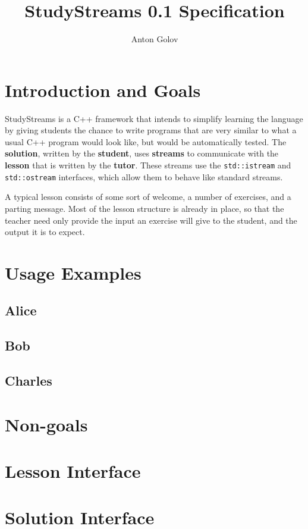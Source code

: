 \documentclass[12pt,a4paper]{report}
\title{StudyStreams 0.1 Specification}
\author{Anton Golov}
\begin{document}
	\maketitle{}
	\tableofcontents{}
	\chapter{Introduction and Goals}
		StudyStreams is a C++ framework that intends to simplify learning
		the language by giving students the chance to write programs that
		are very similar to what a usual C++ program would look like, but
		would be automatically tested.  The \textbf{solution}, written by
		the \textbf{student}, uses \textbf{streams} to communicate with
		the \textbf{lesson} that is written by the \textbf{tutor}.  These
		streams use the \texttt{std::istream} and \texttt{std::ostream}
		interfaces, which allow them to behave like standard streams.

		A typical lesson consists of some sort of welcome, a number of
		exercises, and a parting message.  Most of the lesson structure is
		already in place, so that the teacher need only provide the input
		an exercise will give to the student, and the output it is to
		expect.
	\chapter{Usage Examples}
		\section{Alice}
		\section{Bob}
		\section{Charles}
	\chapter{Non-goals}
	\chapter{Lesson Interface}
	\chapter{Solution Interface}
\end{document}
